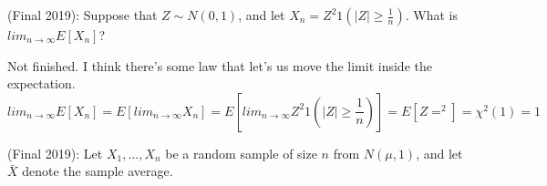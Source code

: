 \documentclass[answers]{exam}
\begin{document}
\begin{questions}

\question (Final 2019): Suppose that $Z \sim N(0,1)$, and let $X_n = Z^2 1(|Z|\geq \frac{1}{n})$. What is $lim_{n \to \infty} E[X_n]$?
\begin{solution} 
    Not finished. I think there's some law that let's us move the limit inside the expectation.
    $$lim_{n \to \infty} E[X_n] = E[lim_{n \to \infty} X_n] = E[lim_{n \to \infty} Z^2 1(|Z|\geq \frac{1}{n})] = E[Z =^2] = \chi^2(1) = 1$$
\end{solution}

\question (Final 2019): Let $X_1,...,X_n$ be a random sample of size $n$ from $N(\mu,1)$, and let $\bar{X}$ denote the sample average.
\end{questions}
\end{document}
